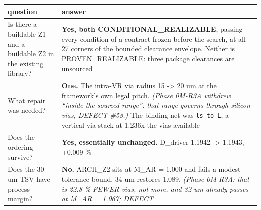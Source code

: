 \documentclass[10pt,]{article}
\begin{document}
\begin{longtable}[]{@{}ll@{}}
\toprule
\begin{minipage}[b]{0.47\columnwidth}\raggedright
question\strut
\end{minipage} & \begin{minipage}[b]{0.47\columnwidth}\raggedright
answer\strut
\end{minipage}\tabularnewline
\midrule
\endhead
\begin{minipage}[t]{0.47\columnwidth}\raggedright
Is there a buildable Z1 and a buildable Z2 in the existing
library?\strut
\end{minipage} & \begin{minipage}[t]{0.47\columnwidth}\raggedright
\textbf{Yes, both CONDITIONAL\_REALIZABLE}, passing every condition of a
contract frozen before the search, at all 27 corners of the bounded
clearance envelope. Neither is PROVEN\_REALIZABLE: three package
clearances are unsourced\strut
\end{minipage}\tabularnewline
\begin{minipage}[t]{0.47\columnwidth}\raggedright
What repair was needed?\strut
\end{minipage} & \begin{minipage}[t]{0.47\columnwidth}\raggedright
\textbf{One.} The intra-VR via radius 15 -\textgreater{} 20 um at the
framework's own legal pitch. \emph{(Phase 0M-R3A withdrew ``inside the
sourced range'': that range governs through-silicon vias, DEFECT \#58.)}
The binding net was \texttt{ls\_to\_L}, a vertical via stack at 1.236x
the vias available\strut
\end{minipage}\tabularnewline
\begin{minipage}[t]{0.47\columnwidth}\raggedright
Does the ordering survive?\strut
\end{minipage} & \begin{minipage}[t]{0.47\columnwidth}\raggedright
\textbf{Yes, essentially unchanged.} D\_driver 1.1942 -\textgreater{}
1.1943, +0.009 \%\strut
\end{minipage}\tabularnewline
\begin{minipage}[t]{0.47\columnwidth}\raggedright
Does the 30 um TSV have process margin?\strut
\end{minipage} & \begin{minipage}[t]{0.47\columnwidth}\raggedright
\textbf{No.} ARCH\_Z2 sits at M\_AR = 1.000 and fails a modest tolerance
bound. 34 um restores 1.089. \emph{(Phase 0M-R3A: that is 22.8 \% FEWER
vias, not more, and 32 um already passes at M\_AR = 1.067; DEFECT
}
\end{minipage}
\end{longtable}
\end{document}
